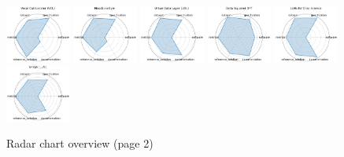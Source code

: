 \begin{figure}[ht!]
\\[1ex]
\includegraphics[width=0.1900\textwidth]{images/vocal_call_locator_vcl_radar.pdf}
\includegraphics[width=0.1900\textwidth]{images/massspecgym_radar.pdf}
\includegraphics[width=0.1900\textwidth]{images/urban_data_layer_udl_radar.pdf}
\includegraphics[width=0.1900\textwidth]{images/delta_squared-dft_radar.pdf}
\includegraphics[width=0.1900\textwidth]{images/llms_for_crop_science_radar.pdf}
\\[1ex]
\includegraphics[width=0.1900\textwidth]{images/spiqa_llm_radar.pdf}
\caption{Radar chart overview (page 2)}
\end{figure}

